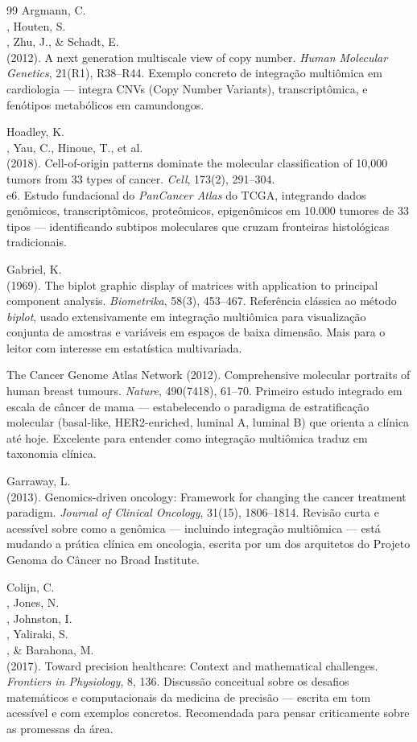 \begin{thebibliography}{99}
 Argmann, C.\\, Houten, S.\\, Zhu, J., \& Schadt, E.\\ (2012). A next generation multiscale view of copy number. \emph{Human Molecular Genetics}, 21(R1), R38--R44. Exemplo concreto de integração multiômica em cardiologia --- integra CNVs (Copy Number Variants), transcriptômica, e fenótipos metabólicos em camundongos.

 Hoadley, K.\\, Yau, C., Hinoue, T., et al.\\ (2018). Cell-of-origin patterns dominate the molecular classification of 10,000 tumors from 33 types of cancer. \emph{Cell}, 173(2), 291--304.\\ e6. Estudo fundacional do \emph{PanCancer Atlas} do TCGA, integrando dados genômicos, transcriptômicos, proteômicos, epigenômicos em 10.000 tumores de 33 tipos --- identificando subtipos moleculares que cruzam fronteiras histológicas tradicionais.

 Gabriel, K.\\ (1969). The biplot graphic display of matrices with application to principal component analysis. \emph{Biometrika}, 58(3), 453--467. Referência clássica ao método \emph{biplot}, usado extensivamente em integração multiômica para visualização conjunta de amostras e variáveis em espaços de baixa dimensão. Mais para o leitor com interesse em estatística multivariada.

 The Cancer Genome Atlas Network (2012). Comprehensive molecular portraits of human breast tumours. \emph{Nature}, 490(7418), 61--70. Primeiro estudo integrado em escala de câncer de mama --- estabelecendo o paradigma de estratificação molecular (basal-like, HER2-enriched, luminal A, luminal B) que orienta a clínica até hoje. Excelente para entender como integração multiômica traduz em taxonomia clínica.

 Garraway, L.\\ (2013). Genomics-driven oncology: Framework for changing the cancer treatment paradigm. \emph{Journal of Clinical Oncology}, 31(15), 1806--1814. Revisão curta e acessível sobre como a genômica --- incluindo integração multiômica --- está mudando a prática clínica em oncologia, escrita por um dos arquitetos do Projeto Genoma do Câncer no Broad Institute.

 Colijn, C.\\, Jones, N.\\, Johnston, I.\\, Yaliraki, S.\\, \& Barahona, M.\\ (2017). Toward precision healthcare: Context and mathematical challenges. \emph{Frontiers in Physiology}, 8, 136. Discussão conceitual sobre os desafios matemáticos e computacionais da medicina de precisão --- escrita em tom acessível e com exemplos concretos. Recomendada para pensar criticamente sobre as promessas da área.


\end{thebibliography}
